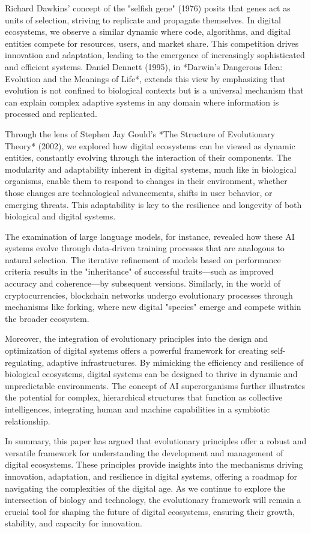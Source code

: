 \documentclass[12pt,twoside]{article}
\begin{document}
Richard Dawkins' concept of the "selfish gene" (1976) posits that genes act as units of selection, striving to replicate and propagate themselves. In digital ecosystems, we observe a similar dynamic where code, algorithms, and digital entities compete for resources, users, and market share. This competition drives innovation and adaptation, leading to the emergence of increasingly sophisticated and efficient systems. Daniel Dennett (1995), in *Darwin’s Dangerous Idea: Evolution and the Meanings of Life*, extends this view by emphasizing that evolution is not confined to biological contexts but is a universal mechanism that can explain complex adaptive systems in any domain where information is processed and replicated.

Through the lens of Stephen Jay Gould's *The Structure of Evolutionary Theory* (2002), we explored how digital ecosystems can be viewed as dynamic entities, constantly evolving through the interaction of their components. The modularity and adaptability inherent in digital systems, much like in biological organisms, enable them to respond to changes in their environment, whether those changes are technological advancements, shifts in user behavior, or emerging threats. This adaptability is key to the resilience and longevity of both biological and digital systems.

The examination of large language models, for instance, revealed how these AI systems evolve through data-driven training processes that are analogous to natural selection. The iterative refinement of models based on performance criteria results in the "inheritance" of successful traits—such as improved accuracy and coherence—by subsequent versions. Similarly, in the world of cryptocurrencies, blockchain networks undergo evolutionary processes through mechanisms like forking, where new digital "species" emerge and compete within the broader ecosystem.

Moreover, the integration of evolutionary principles into the design and optimization of digital systems offers a powerful framework for creating self-regulating, adaptive infrastructures. By mimicking the efficiency and resilience of biological ecosystems, digital systems can be designed to thrive in dynamic and unpredictable environments. The concept of AI superorganisms further illustrates the potential for complex, hierarchical structures that function as collective intelligences, integrating human and machine capabilities in a symbiotic relationship.

In summary, this paper has argued that evolutionary principles offer a robust and versatile framework for understanding the development and management of digital ecosystems. These principles provide insights into the mechanisms driving innovation, adaptation, and resilience in digital systems, offering a roadmap for navigating the complexities of the digital age. As we continue to explore the intersection of biology and technology, the evolutionary framework will remain a crucial tool for shaping the future of digital ecosystems, ensuring their growth, stability, and capacity for innovation.
\end{document}
